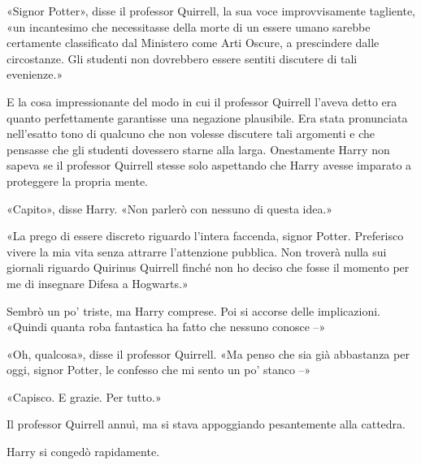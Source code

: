«Signor Potter», disse il professor Quirrell, la sua voce improvvisamente tagliente, «un incantesimo che necessitasse della morte di un essere umano sarebbe certamente classificato dal Ministero come Arti Oscure, a prescindere dalle circostanze. Gli studenti non dovrebbero essere sentiti discutere di tali evenienze.»

E la cosa impressionante del modo in cui il professor Quirrell l’aveva detto era quanto perfettamente garantisse una negazione plausibile. Era stata pronunciata nell’esatto tono di qualcuno che non volesse discutere tali argomenti e che pensasse che gli studenti dovessero starne alla larga. Onestamente Harry non sapeva se il professor Quirrell stesse solo aspettando che Harry avesse imparato a proteggere la propria mente.

«Capito», disse Harry. «Non parlerò con nessuno di questa idea.»

«La prego di essere discreto riguardo l’intera faccenda, signor Potter. Preferisco vivere la mia vita senza attrarre l’attenzione pubblica. Non troverà nulla sui giornali riguardo Quirinus Quirrell finché non ho deciso che fosse il momento per me di insegnare Difesa a Hogwarts.»

Sembrò un po’ triste, ma Harry comprese. Poi si accorse delle implicazioni. «Quindi quanta roba fantastica ha fatto che nessuno conosce –»

«Oh, qualcosa», disse il professor Quirrell. «Ma penso che sia già abbastanza per oggi, signor Potter, le confesso che mi sento un po’ stanco –»

«Capisco. E grazie. Per tutto.»

Il professor Quirrell annuì, ma si stava appoggiando pesantemente alla cattedra.

Harry si congedò rapidamente.



